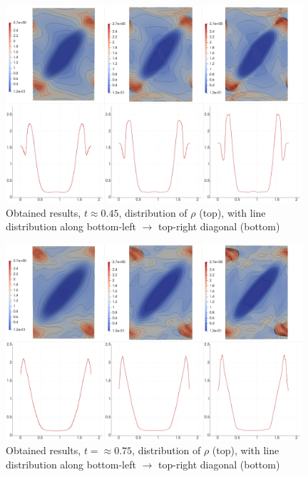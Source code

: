 \begin{figure}[H]
	\begin{center}
		\includegraphics[width=0.98\textwidth]{img/mhd-blast/new/blast,noadapt9.jpg}
\vspace{-3mm}
	\caption{Obtained results, $t \approx 0.45$, distribution of $\rho$ (top), with line distribution along bottom-left $\rightarrow$ top-right diagonal (bottom)}
	\label{figure:blastNew04}
	\end{center}
\end{figure}
\vspace{-10mm}

\begin{figure}[H]
	\begin{center}
		\includegraphics[width=0.98\textwidth]{img/mhd-blast/new/blast,noadapt14.jpg}
\vspace{-3mm}
	\caption{Obtained results, $t = \approx 0.75$, distribution of $\rho$ (top), with line distribution along bottom-left $\rightarrow$ top-right diagonal (bottom)}
	\label{figure:blastNew05}
	\end{center}
\end{figure}
\vspace{-10mm}


